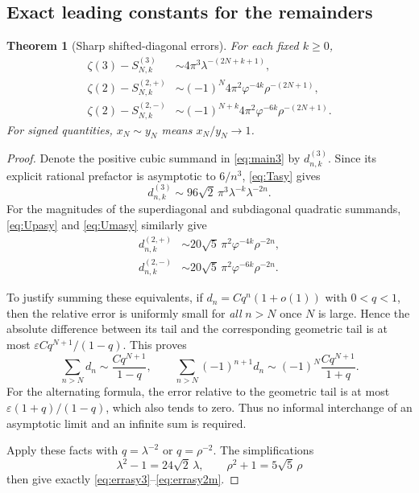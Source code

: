 \documentclass[11pt]{article}
\numberwithin{equation}{section}
\newtheorem{theorem}{Theorem}[section]
\theoremstyle{definition}
\theoremstyle{remark}
\newcommand{\Sthree}[2]{S^{(3)}_{#1,#2}}
\newcommand{\Stwop}[2]{S^{(2,+)}_{#1,#2}}
\newcommand{\Stwom}[2]{S^{(2,-)}_{#1,#2}}
\begin{document}
\subsection{Exact leading constants for the remainders}
\begin{theorem}[Sharp shifted-diagonal errors]\label{thm:errorasy}
For each fixed $k\geq0$,
\begin{align}
 \zeta(3)-\Sthree{N}{k}
 &\sim4\pi^3\lambda^{-(2N+k+1)},\label{eq:errasy3}\\
 \zeta(2)-\Stwop{N}{k}
 &\sim(-1)^N4\pi^2\varphi^{-4k}\rho^{-(2N+1)},\label{eq:errasy2p}\\
 \zeta(2)-\Stwom{N}{k}
 &\sim(-1)^{N+k}4\pi^2\varphi^{-6k}\rho^{-(2N+1)}.\label{eq:errasy2m}
\end{align}
For signed quantities, $x_N\sim y_N$ means $x_N/y_N\to1$.
\end{theorem}
\begin{proof}
Denote the positive cubic summand in \eqref{eq:main3} by $d^{(3)}_{n,k}$.
Since its explicit rational prefactor is asymptotic to $6/n^3$,
\eqref{eq:Tasy} gives
\begin{equation}\label{eq:term3asy}
 d^{(3)}_{n,k}\sim96\sqrt2\,\pi^3\lambda^{-k}\lambda^{-2n}.
\end{equation}
For the magnitudes of the superdiagonal and subdiagonal quadratic
summands, \eqref{eq:Upasy} and \eqref{eq:Umasy} similarly give
\begin{align}
 d^{(2,+)}_{n,k}&\sim20\sqrt5\,\pi^2\varphi^{-4k}\rho^{-2n},\label{eq:term2pasy}\\
 d^{(2,-)}_{n,k}&\sim20\sqrt5\,\pi^2\varphi^{-6k}\rho^{-2n}.\label{eq:term2masy}
\end{align}

To justify summing these equivalents, if $d_n=Cq^n(1+o(1))$ with
$0<q<1$, then the relative error is uniformly small for \emph{all}
$n>N$ once $N$ is large. Hence the absolute difference between its tail
and the corresponding geometric tail is at most
$\varepsilon Cq^{N+1}/(1-q)$. This proves
\[
 \sum_{n>N}d_n\sim\frac{Cq^{N+1}}{1-q},\qquad
 \sum_{n>N}(-1)^{n+1}d_n
 \sim(-1)^N\frac{Cq^{N+1}}{1+q}.
\]
For the alternating formula, the error relative to the geometric tail
is at most $\varepsilon(1+q)/(1-q)$, which also tends to zero.
Thus no informal interchange of an asymptotic limit and an infinite
sum is required.

Apply these facts with $q=\lambda^{-2}$ or $q=\rho^{-2}$.
The simplifications
\[
 \lambda^2-1=24\sqrt2\,\lambda,\qquad
 \rho^2+1=5\sqrt5\,\rho
\]
then give exactly \eqref{eq:errasy3}--\eqref{eq:errasy2m}.
\end{proof}
\end{document}
